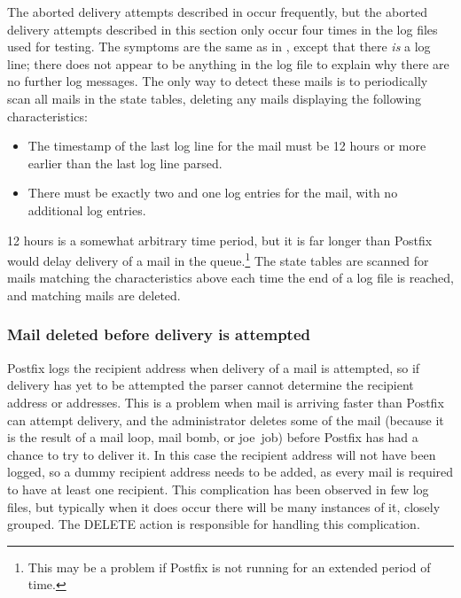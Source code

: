 \label{yet-more-aborted-delivery-attempts}

The aborted delivery attempts described in
 occur frequently, but the aborted
delivery attempts described in this section only occur four times in the
\numberOFlogFILES{} log files used for testing.  The symptoms are the same
as in , except that there
\textit{is\/} a  log line; there does not appear to be
anything in the log file to explain why there are no further log messages.
The only way to detect these mails is to periodically scan all mails in the
state tables, deleting any mails displaying the following characteristics:

\begin{itemize}

    \item The timestamp of the last log line for the mail must be 12 hours
        or more earlier than the last log line parsed.

    \item There must be exactly two  and one 
        log entries for the mail, with no additional log entries.

\end{itemize}

12 hours is a somewhat arbitrary time period, but it is far longer than
Postfix would delay delivery of a mail in the queue.\footnote{This may be a
problem if Postfix is not running for an extended period of time.}  The
state tables are scanned for mails matching the characteristics above each
time the end of a log file is reached, and matching mails are deleted.

\subsubsection{Mail deleted before delivery is attempted}

\label{Mail deleted before delivery is attempted}

Postfix logs the recipient address when delivery of a mail is attempted, so
if delivery has yet to be attempted the parser cannot determine the
recipient address or addresses.  This is a problem when mail is arriving
faster than Postfix can attempt delivery, and the administrator deletes
some of the mail (because it is the result of a mail loop, mail bomb, or
joe~job) before Postfix has had a chance to try to deliver it.  In this
case the recipient address will not have been logged, so a dummy recipient
address needs to be added, as every mail is required to have at least one
recipient.  This complication has been observed in few log files, but
typically when it does occur there will be many instances of it, closely
grouped.  The DELETE action is responsible for handling this complication.

